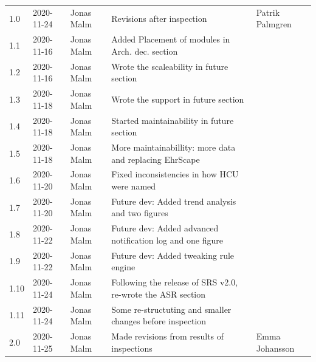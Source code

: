 \documentclass{article}
\begin{document}
\begin{table}
\begin{tabular}{|l|l|l|p{7cm}|p{3cm}|}
1.0 & 2020-11-24 & Jonas Malm & Revisions after inspection & Patrik Palmgren\\
1.1 & 2020-11-16 & Jonas Malm & Added Placement of modules in Arch. dec. section & \\
1.2 & 2020-11-16 & Jonas Malm & Wrote the scaleability in future section & \\
1.3 & 2020-11-18 & Jonas Malm & Wrote the support in future section & \\
1.4 & 2020-11-18 & Jonas Malm & Started maintainability in future section & \\
1.5 & 2020-11-18 & Jonas Malm & More maintainabillity: more data and replacing EhrScape & \\
1.6 & 2020-11-20 & Jonas Malm & Fixed inconsistencies in how HCU were named & \\
1.7 & 2020-11-20 & Jonas Malm & Future dev: Added trend analysis and two figures & \\
1.8 & 2020-11-22 & Jonas Malm & Future dev: Added advanced notification log and one figure & \\
1.9 & 2020-11-22 & Jonas Malm & Future dev: Added tweaking rule engine & \\
1.10 & 2020-11-24 & Jonas Malm & Following the release of SRS v2.0, re-wrote the ASR section & \\
1.11 & 2020-11-24 & Jonas Malm & Some re-structuting and smaller changes before inspection & \\ 
2.0 & 2020-11-25 & Jonas Malm & Made revisions from results of inspections & Emma Johansson\\ 
\hline
\end{tabular}
\end{table}
\end{document}

